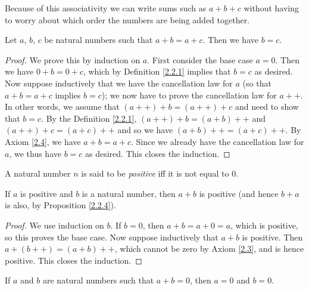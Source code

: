 \begin{note}
Because of this associativity we can write sums such as \(a + b + c\) without having to worry about which order the numbers are being added together.
\end{note}

\begin{proposition}\label{2.2.6}
Let \(a\), \(b\), \(c\) be natural numbers such that \(a + b = a + c\).
Then we have \(b = c\).
\end{proposition}

\begin{proof}
We prove this by induction on \(a\).
First consider the base case \(a = 0\).
Then we have \(0 + b = 0 + c\), which by Definition \ref{2.2.1} implies that \(b = c\) as desired.
Now suppose inductively that we have the cancellation law for \(a\) (so that \(a + b = a + c\) implies \(b = c\));
we now have to prove the cancellation law for \(a++\).
In other words, we assume that \((a++) + b = (a++) + c\) and need to show that \(b = c\).
By the Definition \ref{2.2.1}, \((a++) + b = (a + b)++\) and \((a++) + c = (a + c)++\) and so we have \((a + b)++ = (a + c)++\).
By Axiom \ref{2.4}, we have \(a + b = a + c\).
Since we already have the cancellation law for \(a\), we thus have \(b = c\) as desired.
This closes the induction.
\end{proof}

\begin{definition}\label{2.2.7}
A natural number \(n\) is said to be \emph{positive} iff it is not equal to \(0\).
\end{definition}

\begin{proposition}\label{2.2.8}
If \(a\) is positive and \(b\) is a natural number, then \(a + b\) is positive (and hence \(b + a\) is also, by Proposition \ref{2.2.4}).
\end{proposition}

\begin{proof}
We use induction on \(b\).
If \(b = 0\), then \(a + b = a + 0 = a\), which is positive, so this proves the base case.
Now suppose inductively that \(a + b\) is positive.
Then \(a + (b++) = (a + b)++\), which cannot be zero by Axiom \ref{2.3}, and is hence positive.
This closes the induction.
\end{proof}

\begin{corollary}\label{2.2.9}
If \(a\) and \(b\) are natural numbers such that \(a + b = 0\), then \(a = 0\) and \(b = 0\).
\end{corollary}

